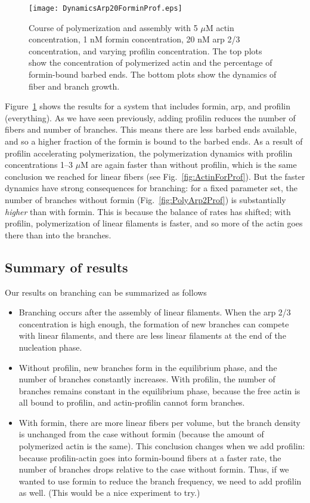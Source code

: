 \documentclass[11pt]{article}
\newcommand{\red}[1]{\color{red}#1\normalcolor}
\begin{document}
\begin{figure}
\centering
\texttt{[image: DynamicsArp20ForminProf.eps]}
\caption{\label{fig:Arp20ForminProf}Course of polymerization and assembly with 5 $\mu$M actin concentration, 1 nM formin concentration, 20 nM arp 2/3 concentration, and varying profilin concentration.  The top plots show the concentration of polymerized actin and the percentage of formin-bound barbed ends. The bottom plots show the dynamics of fiber and branch growth. }
\end{figure}

Figure\ \ref{fig:Arp20ForminProf} shows the results for a system that includes formin, arp, and profilin (everything). As we have seen previously, adding profilin reduces the number of fibers and number of branches. This means there are less barbed ends available, and so a higher fraction of the formin is bound to the barbed ends. As a result of profilin accelerating polymerization, the polymerization dynamics with profilin concentrations 1--3 $\mu$M are again faster than without profilin, which is the same conclusion we reached for linear fibers (see Fig.\ \ref{fig:ActinForProf}). But the faster dynamics have strong consequences for branching: for a fixed parameter set, the number of branches without formin (Fig.\ \ref{fig:PolyArp2Prof}) is substantially \emph{higher} than with formin. This is because the balance of rates has shifted; with profilin, polymerization of linear filaments is faster, and so more of the actin goes there than into the branches. 

\subsection{Summary of results}
Our results on branching can be summarized as follows
\begin{itemize}
\item Branching occurs after the assembly of linear filaments. When the arp 2/3 concentration is high enough, the formation of new branches can compete with linear filaments, and there are less linear filaments at the end of the nucleation phase. 
\item Without profilin, new branches form in the equilibrium phase, and the number of branches constantly increases. With profilin, the number of branches remains constant in the equilibrium phase, because the free actin is all bound to profilin, and actin-profilin cannot form branches.  
\item With formin, there are more linear fibers per volume, but the branch density is unchanged from the case without formin (because the amount of polymerized actin is the same). This conclusion changes when we add profilin: because profilin-actin goes into formin-bound fibers at a faster rate, the number of branches drops relative to the case without formin. Thus, if we wanted to use formin to reduce the branch frequency, we need to add profilin as well. \red{(This would be a nice experiment to try.)}
\end{itemize}
\end{document}
